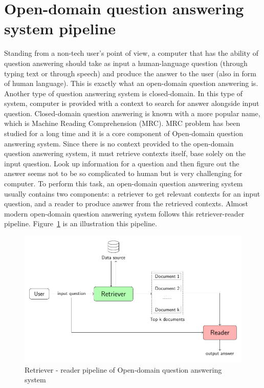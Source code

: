 \documentclass[3p, sort&compress, 12pt]{elsarticle}
\begin{document}
\section{Open-domain question answering system pipeline}
Standing from a non-tech user's point of view, a computer that has the ability of question answering should take as input a human-language question (through typing text or through speech) and produce the answer to the user (also in form of human language). This is exactly what an open-domain question answering is. Another type of question answering system is closed-domain. In this type of system, computer is provided with a context to search for answer alongside input question. Closed-domain question answering is known with a more popular name, which is Machine Reading Comprehension (MRC). MRC problem has been studied for a long time and it is a core component of Open-domain question answering system. Since there is no context provided to the open-domain question answering system, it must retrieve contexts itself, base solely on the input question. Look up information for a question and then figure out the answer seems not to be so complicated to human but is very challenging for computer. To perform this task, an open-domain question answering system usually contains two components: a retriever to get relevant contexts for an input question, and a reader to produce answer from the retrieved contexts. Almost modern open-domain question answering system follows this retriever-reader pipeline. Figure~\ref{fig:01} is an illustration this pipeline. 
\begin{figure}[!htbp]
	\centering
	\includegraphics[scale=.8]{images/PDF/overall_arch/architecture.pdf}
	\caption{Retriever - reader pipeline of Open-domain question answering system}
	\label{fig:01}
\end{figure}
\end{document}
